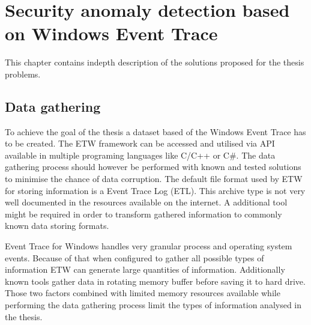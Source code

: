 \documentclass[a4paper,twoside,12pt]{book}
\begin{document}




\chapter{Security anomaly detection based on Windows Event Trace}

This chapter contains indepth description of the solutions proposed for the thesis problems. 

\section{Data gathering}
To achieve the goal of the thesis a dataset based of the Windows Event Trace has to 
be created. The ETW framework can be accessed and utilised via API available in multiple
programing languages like C/C++\cite{bib:etwcpp} or C\#\cite{bib:etwcsharp}. The 
data gathering process should however be performed with known and tested solutions to
minimise the chance of data corruption. The default file format used by ETW for storing 
information is a Event Trace Log (ETL). This archive type is not very well documented in 
the resources available on the internet. A additional tool might be required in order to 
transform gathered information to commonly known data storing formats.

Event Trace for Windows handles very granular process and operating system events.
Because of that when configured to gather all possible types of information ETW can generate
large quantities of information. Additionally known tools gather data in rotating memory buffer 
before saving it to hard drive. Those two factors combined with limited memory resources 
available while performing the data gathering process limit the types of information analysed 
in the thesis. 
\end{document}
